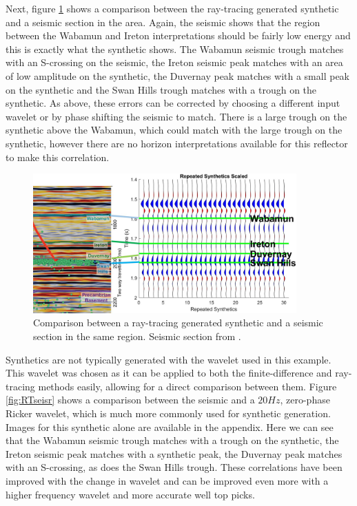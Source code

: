 \documentclass[12pt]{article}
\begin{document}
	Next, figure \ref{fig:RTseis} shows a comparison between the ray-tracing generated synthetic and a seismic section in the area. Again, the seismic shows that the region between the Wabamun and Ireton interpretations should be fairly low energy and this is exactly what the synthetic shows. The Wabamun seismic trough matches with an S-crossing on the seismic, the Ireton seismic peak matches with an area of low amplitude on the synthetic, the Duvernay peak matches with a small peak on the synthetic and the Swan Hills trough matches with a trough on the synthetic. As above, these errors can be corrected by choosing a different input wavelet or by phase shifting the seismic to match. There is a large trough on the synthetic above the Wabamun, which could match with the large trough on the synthetic, however there are no horizon interpretations available for this reflector to make this correlation.

\begin{figure}[!htb]
	\centering
	\includegraphics[width=0.9\textwidth]{Figures/RTseis.jpg}
	\caption[Fox Creek seismic ray-tracing comparison]{Comparison between a ray-tracing generated synthetic and a seismic section in the same region. Seismic section from \cite{german2018}. }
	\label{fig:RTseis}
\end{figure}	

	Synthetics are not typically generated with the wavelet used in this example. This wavelet was chosen as it can be applied to both the finite-difference and ray-tracing methods easily, allowing for a direct comparison between them. Figure \ref{fig:RTseisr} shows a comparison between the seismic and a $20 Hz$, zero-phase Ricker wavelet, which is much more commonly used for synthetic generation. Images for this synthetic alone are available in the appendix. Here we can see that the Wabamun seismic trough matches with a trough on the synthetic, the Ireton seismic peak matches with a synthetic peak, the Duvernay peak matches with an S-crossing, as does the Swan Hills trough. These correlations have been improved with the change in wavelet and can be improved even more with a higher frequency wavelet and more accurate well top picks. 
\end{document}
